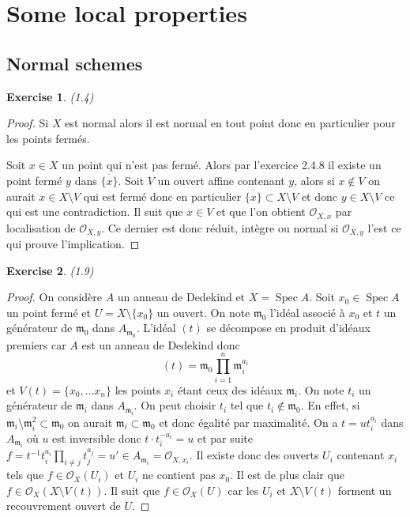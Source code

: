\documentclass[A4, 11pt]{article}
\newtheorem{exer}{Exercise}
\def\Spec{ \operatorname{Spec}}
\begin{document}
 \section{Some local properties}
 \subsection{Normal schemes}
 \begin{exer}(1.4)
 \end{exer}
 \begin{proof}
 Si $X$ est normal alors il est normal en tout point donc en particulier pour les points fermés.
 
 Soit $x\in X$ un point qui n'est pas fermé. Alors par l'exercice 2.4.8 il existe un point fermé $y$ dans $\overline{\{x\}}$. Soit $V$ un ouvert affine contenant $y$, alors si $x\notin V$ on aurait $x\in X\setminus V$ qui est fermé donc en particulier $\overline{\{x\}}\subset X\setminus V$ et donc $y \in X\setminus V$ ce qui est une contradiction. Il suit que $x\in V$ et que l'on obtient $\mathcal{O}_{X,x}$ par localisation de $\mathcal{O}_{X,y}$. Ce dernier est donc réduit, intègre ou normal si $\mathcal{O}_{X,y}$ l'est ce qui prouve l'implication.
 \end{proof}
 
 \begin{exer}(1.9)
 \end{exer}
 \begin{proof}
 On considère $A$ un anneau de Dedekind et $X=\Spec A$. Soit $x_0\in \Spec A$ un point fermé et $U=X\setminus \{x_0\}$ un ouvert. On note $\mathfrak{m}_0$ l'idéal associé à $x_0$ et $t$ un générateur de $\mathfrak{m_0}$ dans $A_{\mathfrak{m}_0}$. L'idéal $(t)$ se décompose en produit d'idéaux premiers car $A$ est un anneau de Dedekind donc 
 $$(t)= \mathfrak{m}_0 \prod\limits_{i=1}^{n} \mathfrak{m}_i^{a_i}$$
 et $V(t)=\{x_0,\dots x_n\}$ les points $x_i$ étant ceux des idéaux $\mathfrak{m}_i$.
 On note $t_i$ un générateur de $\mathfrak{m}_i$ dans $A_{\mathfrak{m_i}}$. On peut choisir $t_i$ tel que $t_i\notin \mathfrak{m}_0$. En effet, si $\mathfrak{m}_i\setminus \mathfrak{m}_i^2 \subset \mathfrak{m}_0$ on aurait $\mathfrak{m}_i\subset \mathfrak{m}_0$ et donc égalité par maximalité. On a $t=ut_i^{a_i}$ dans $A_{\mathfrak{m_i}}$ où $u$ est inversible donc $t\cdot t_i^{-a_i}=u$ et par suite $f=t^{-1}t_i^{a_i}\prod\limits_{i\neq j} t_j^{a_j} =u'\in A_{\mathfrak{m}_i}=\mathcal{O}_{X,x_i}$. Il existe donc des ouverts $U_i$ contenant $x_i$ tels que $f\in \mathcal{O}_X(U_i)$  et $U_i$ ne contient pas $x_0$. Il est de plus clair que $f\in \mathcal{O}_X(X\setminus V(t))$. Il suit que $f\in \mathcal{O}_X(U)$ car les $U_i$ et $X\setminus V(t)$ forment un recouvrement ouvert de $U$.
 \end{proof}
\end{document}
